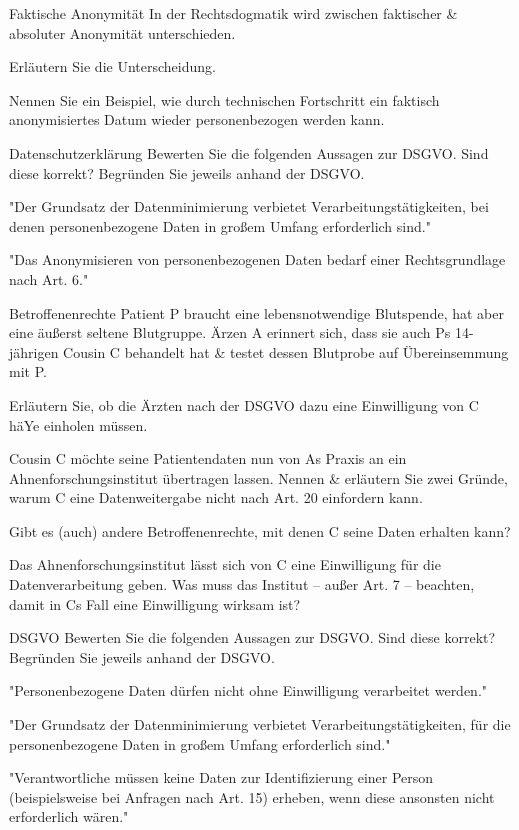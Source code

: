 \documentclass{exercisesheet}
\begin{document}
\begin{eexercises}{Faktische Anonymität}{
    In der Rechtsdogmatik wird zwischen faktischer \& absoluter Anonymität unterschieden.
  }
  \item Erläutern Sie die Unterscheidung.
  \item Nennen Sie ein Beispiel, wie durch technischen Fortschritt ein faktisch anonymisiertes Datum wieder personenbezogen werden kann.
\end{eexercises}

\begin{eexercises}[2]{Datenschutzerklärung}{
    Bewerten Sie die folgenden Aussagen zur DSGVO. Sind diese korrekt? Begründen Sie jeweils anhand der DSGVO.
  }
  \item "Der Grundsatz der Datenminimierung verbietet Verarbeitungstätigkeiten, bei denen personenbezogene Daten in großem Umfang erforderlich sind."
  \item "Das Anonymisieren von personenbezogenen Daten bedarf einer Rechtsgrundlage nach Art. 6."
\end{eexercises}

\begin{eexercises}{Betroffenenrechte}{
    Patient P braucht eine lebensnotwendige Blutspende, hat aber eine äußerst seltene Blutgruppe. Ärzen A erinnert sich, dass sie auch Ps 14-jährigen Cousin C behandelt hat \& testet dessen Blutprobe auf Übereinsemmung mit P.
  }
  \item Erläutern Sie, ob die Ärzten nach der DSGVO dazu eine Einwilligung von C häYe einholen müssen.
  \item Cousin C möchte seine Patientendaten nun von As Praxis an ein Ahnenforschungsinstitut übertragen lassen. Nennen \& erläutern Sie zwei Gründe, warum C eine Datenweitergabe nicht nach Art. 20 einfordern kann.
  \item Gibt es (auch) andere Betroffenenrechte, mit denen C seine Daten erhalten kann?
  \item Das Ahnenforschungsinstitut lässt sich von C eine Einwilligung für die Datenverarbeitung geben. Was muss das Institut – außer Art. 7 – beachten, damit in Cs Fall eine Einwilligung wirksam ist?
\end{eexercises}

\begin{eexercises}{DSGVO}{
    Bewerten Sie die folgenden Aussagen zur DSGVO. Sind diese korrekt? Begründen Sie jeweils anhand der DSGVO.
  }
  \item "Personenbezogene Daten dürfen nicht ohne Einwilligung verarbeitet werden."
  \item "Der Grundsatz der Datenminimierung verbietet Verarbeitungstätigkeiten, für die personenbezogene Daten in großem Umfang erforderlich sind."
  \item "Verantwortliche müssen keine Daten zur Identifizierung einer Person (beispielsweise bei Anfragen nach Art. 15) erheben, wenn diese ansonsten nicht erforderlich wären."
\end{eexercises}
\end{document}
